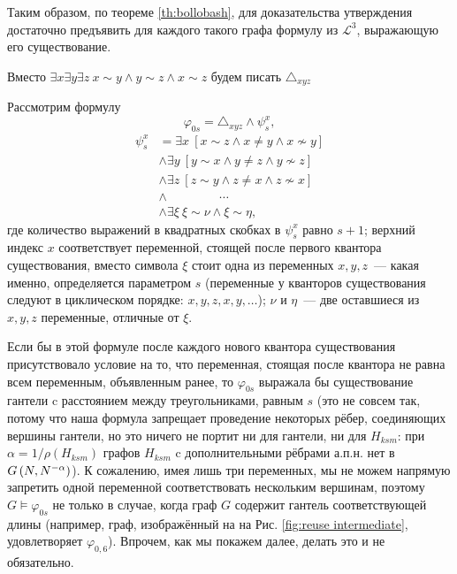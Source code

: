 Таким образом, по теореме \ref{th:bollobash}, для доказательства утверждения достаточно предъявить для каждого такого графа формулу из  $\mathcal{L}^3$, выражающую его существование.




Вместо 
$\exists x \exists y \exists z ~ x \sim y \wedge y \sim z \wedge x \sim z$
будем писать 
$\triangle_{xyz}$

Рассмотрим формулу
\[ \varphi_{0s} = \triangle_{xyz} \wedge \psi_s^{x},\]
\begin{equation}
\label{f:gantel}
\begin{split}
\psi_s^x &= \exists x ~ 
    \left[ x \sim z \wedge x \neq y \wedge x \nsim y  \right] \\
&\wedge \exists y ~
    \left[ y \sim x \wedge y \neq z \wedge y \nsim z \right] \\
&\wedge \exists z ~
    \left[ z \sim y \wedge z \neq x \wedge z \nsim x  \right] \\
&\wedge ~ \qquad \qquad \cdots \\
&\wedge \exists \xi ~ 
    \xi \sim \nu \wedge \xi \sim \eta,
\end{split}
\end{equation}
где количество выражений в квадратных скобках в $\psi_{s}^{x}$ равно $s+1$; верхний индекс $x$ соответствует переменной, стоящей после первого квантора существования, вместо символа $\xi$ стоит одна из переменных $x,y,z$~--- какая именно, определяется параметром $s$ (переменные у кванторов существования следуют в циклическом порядке: $x,y,z,x,y, \ldots$); $\nu$ и $\eta$~--- две оставшиеся из $x,y,z$ переменные, отличные от $\xi$. 

Если бы в этой формуле после каждого нового квантора существования присутствовало условие на то, что переменная, стоящая после квантора не равна всем переменным, объявленным ранее, то $\varphi_{0s}$ выражала бы существование гантели c расстоянием между треугольниками, равным $s$ (это не совсем так, потому что наша формула запрещает проведение некоторых рёбер, соединяющих вершины гантели, но это ничего не портит ни для гантели, ни для $H_{ksm}$:  при $\alpha = 1/\rho(H_{ksm})$ графов $H_{ksm}$ c дополнительными рёбрами а.п.н. нет в $G\left(N,N^{-\alpha}\right)$). 
К сожалению, имея лишь три переменных, мы не можем напрямую запретить одной переменной соответствовать нескольким вершинам, поэтому $G \vDash \varphi_{0s}$ не только в случае, когда граф $G$ содержит гантель соответствующей длины (например, граф, изображённый на на Рис. \ref{fig:reuse intermediate}, удовлетворяет $\varphi_{0,6}$).
Впрочем, как мы покажем далее, делать это и не обязательно.

